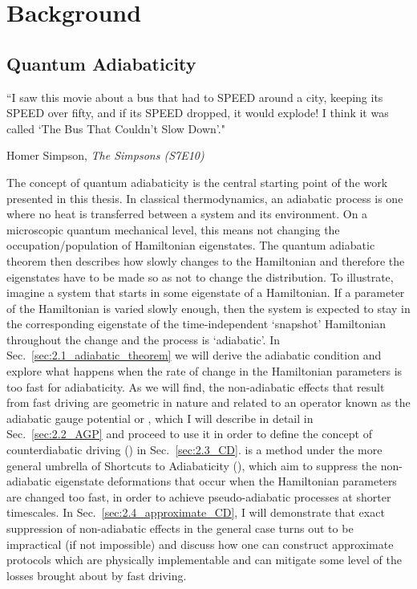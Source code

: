 \part{Background}\label{part:background}
\chapter{Quantum Adiabaticity}\label{chap:2_adiabaticity}

\epigraph{``I saw this movie about a bus that had to SPEED around a city, keeping its SPEED over fifty, and if its SPEED dropped, it would explode! I think it was called `The Bus That Couldn’t Slow Down'."}{Homer Simpson, \emph{The Simpsons (S7E10)}}

    
The concept of quantum adiabaticity is the central starting point of the work presented in this thesis. In classical thermodynamics, an adiabatic process is one where no heat is transferred between a system and its environment. On a microscopic quantum mechanical level, this means not changing the occupation/population of Hamiltonian eigenstates. The quantum adiabatic theorem then describes how slowly changes to the Hamiltonian and therefore the eigenstates have to be made so as not to change the distribution. To illustrate, imagine a system that starts in some eigenstate of a Hamiltonian. If a parameter of the Hamiltonian is varied slowly enough, then the system is expected to stay in the corresponding eigenstate of the time-independent `snapshot' Hamiltonian throughout the change and the process is `adiabatic'. In Sec.~\ref{sec:2.1_adiabatic_theorem} we will derive the adiabatic condition and explore what happens when the rate of change in the Hamiltonian parameters is too fast for adiabaticity. As we will find, the non-adiabatic effects that result from fast driving are geometric in nature and related to an operator known as the adiabatic gauge potential \cite{kolodrubetz_geometry_2017, jarzynski_geometric_1995} or , which I will describe in detail in Sec.~\ref{sec:2.2_AGP} and proceed to use it in order to define the concept of counterdiabatic driving \cite{berry_transitionless_2009, demirplak_adiabatic_2003} () in Sec.~\ref{sec:2.3_CD}.  is a method under the more general umbrella of Shortcuts to Adiabaticity \cite{guery-odelin_shortcuts_2019} (), which aim to suppress the non-adiabatic eigenstate deformations that occur when the Hamiltonian parameters are changed too fast, in order to achieve pseudo-adiabatic processes at shorter timescales. In Sec.~\ref{sec:2.4_approximate_CD}, I will demonstrate that exact suppression of non-adiabatic effects in the general case turns out to be impractical (if not impossible) and discuss how one can construct approximate  protocols which are physically implementable and can mitigate some level of the losses brought about by fast driving.
        
